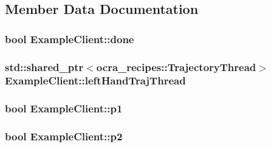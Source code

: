 \subsection{\-Member \-Data \-Documentation}
\hypertarget{classExampleClient_acd2cf0f0479ff8bbf5b64924d83beb60}{
\subsubsection[{done}]{\setlength{\rightskip}{0pt plus 5cm}bool {\bf \-Example\-Client\-::done}}}\label{classExampleClient_acd2cf0f0479ff8bbf5b64924d83beb60}
\hypertarget{classExampleClient_a4311b0e8c4878c23df2b5ba048d8bc05}{
\subsubsection[{left\-Hand\-Traj\-Thread}]{\setlength{\rightskip}{0pt plus 5cm}std\-::shared\-\_\-ptr$<$ocra\-\_\-recipes\-::\-Trajectory\-Thread$>$ {\bf \-Example\-Client\-::left\-Hand\-Traj\-Thread}}}\label{classExampleClient_a4311b0e8c4878c23df2b5ba048d8bc05}
\hypertarget{classExampleClient_a7fb2b50cbdac0ec3a32e44b5bbc3b11f}{
\subsubsection[{p1}]{\setlength{\rightskip}{0pt plus 5cm}bool {\bf \-Example\-Client\-::p1}}}\label{classExampleClient_a7fb2b50cbdac0ec3a32e44b5bbc3b11f}
\hypertarget{classExampleClient_a07c2bc5c5c522e77a726017c28db2ec9}{
\subsubsection[{p2}]{\setlength{\rightskip}{0pt plus 5cm}bool {\bf \-Example\-Client\-::p2}}}\label{classExampleClient_a07c2bc5c5c522e77a726017c28db2ec9}
